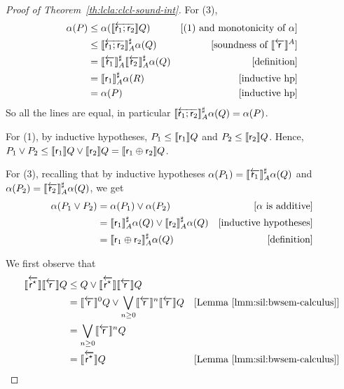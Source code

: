 \begin{proof}[Proof of Theorem~\ref{th:lcla:clcl-sound-int}]
	\noindent For (3),
	\begin{align*}
		\alpha(P) & \le \alpha(\llbracket\overleftarrow{\mathsf{r}_1; \mathsf{r}_2}\rrbracket Q)                                & [\text{(1) and monotonicity of }\alpha] \\
		          & \le \llbracket\overleftarrow{\mathsf{r}_1; \mathsf{r}_2}\rrbracket^{\sharp}_{A} \alpha(Q)                   & [\text{soundness of }\llbracket\overleftarrow{\mathsf{r}}\rrbracket^{A}] \\
		          & = \llbracket\overleftarrow{\mathsf{r}_1}\rrbracket^{\sharp}_{A} \llbracket\overleftarrow{\mathsf{r}_2}\rrbracket^{\sharp}_{A} \alpha(Q) & [\text{definition}]                     \\
		          & = \llbracket\mathsf{r}_1\rrbracket^{\sharp}_{A} \alpha(R)                              & [\text{inductive hp}]                   \\
		          & = \alpha(P)                                                           & [\text{inductive hp}]
	\end{align*}
	So all the lines are equal, in particular $\llbracket\overleftarrow{\mathsf{r}_1; \mathsf{r}_2}\rrbracket^{\sharp}_{A} \alpha(Q) = \alpha(P)$.

	For (1), by inductive hypotheses, $P_1 \le \llbracket\mathsf{r}_1\rrbracket Q$ and $P_2 \le \llbracket\mathsf{r}_2\rrbracket Q$. Hence, $P_1 \lor P_2 \le \llbracket\mathsf{r}_1\rrbracket Q \lor \llbracket\mathsf{r}_2\rrbracket Q = \llbracket\mathsf{r}_1 \oplus \mathsf{r}_2\rrbracket Q$.

	\noindent For (3), recalling that by inductive hypotheses $\alpha(P_1) = \llbracket\overleftarrow{\mathsf{r}_1}\rrbracket^{\sharp}_{A} \alpha(Q)$ and $\alpha(P_2) = \llbracket\overleftarrow{\mathsf{r}_2}\rrbracket^{\sharp}_{A} \alpha(Q)$, we get
	\begin{align*}
		\alpha(P_1 \lor P_2) & = \alpha(P_1) \lor \alpha(P_2)                                                       & [\alpha\text{ is additive}]   \\
		                     & = \llbracket\mathsf{r}_1\rrbracket^{\sharp}_{A} \alpha(Q) \lor \llbracket\mathsf{r}_2\rrbracket^{\sharp}_{A} \alpha(Q) & [\text{inductive hypotheses}] \\
		                     & = \llbracket\mathsf{r}_1 \oplus \mathsf{r}_2\rrbracket^{\sharp}_{A} \alpha(Q)                              & [\text{definition}]
	\end{align*}

	We first observe that
	\begin{align*}
		\llbracket\overleftarrow{\mathsf{r}^{\star}}\rrbracket \llbracket\overleftarrow{\mathsf{r}}\rrbracket Q & \le Q \lor \llbracket\overleftarrow{\mathsf{r}^{\star}}\rrbracket \llbracket\overleftarrow{\mathsf{r}}\rrbracket Q                                &                                             \\
		                                       & =\llbracket\overleftarrow{\mathsf{r}}\rrbracket^0 Q \lor \bigvee\limits_{n \ge 0} \llbracket\overleftarrow{\mathsf{r}}\rrbracket^n \llbracket\overleftarrow{\mathsf{r}}\rrbracket Q & [\text{Lemma }\ref{lmm:sil:bwsem-calculus}] \\
		                                       & =\bigvee\limits_{n \ge 0} \llbracket\overleftarrow{\mathsf{r}}\rrbracket^n Q                                      &                                             \\
		                                       & =\llbracket\overleftarrow{\mathsf{r}^{\star}}\rrbracket Q                                                        & [\text{Lemma }\ref{lmm:sil:bwsem-calculus}]
	\end{align*}


\end{proof}

